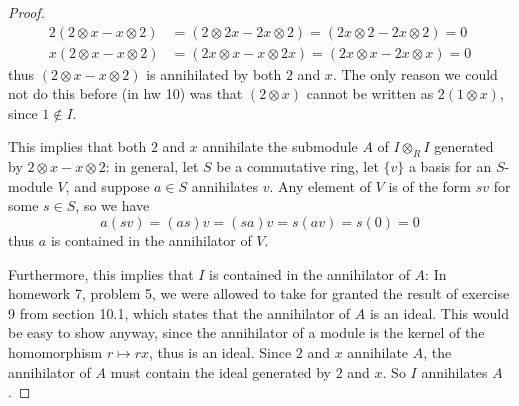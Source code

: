 \documentclass[10pt]{article}
\begin{document}
\begin{enumerate}
\begin{proof}
\begin{align*}
2(2 \otimes x - x \otimes 2) &= (2 \otimes 2x - 2x \otimes 2) = (2x \otimes 2 - 2x \otimes 2) = 0
\\
x(2 \otimes x - x \otimes 2) &= (2x \otimes x - x \otimes 2x) = (2x \otimes x - 2x \otimes x) = 0
\end{align*}
thus $(2 \otimes x - x \otimes 2)$ is annihilated by both $2$ and $x$.  The only reason we could not do this before (in hw 10) was that $(2 \otimes x)$ cannot be written as $2(1 \otimes x)$, since $1 \not \in I$.

This implies that both $2$ and $x$ annihilate the submodule $A$ of $I \otimes_R I$ generated by $2 \otimes x - x \otimes 2$: in general, let $S$ be a commutative ring, let $\{v\}$ a basis for an $S$-module $V$, and suppose $a \in S$ annihilates $v$.  Any element of $V$ is of the form $sv$ for some $s \in S$, so we have
$$
a(sv) = (as)v = (sa)v = s(av) = s(0) = 0
$$
thus $a$ is contained in the annihilator of $V$.

Furthermore, this implies that $I$ is contained in the annihilator of $A$:  In homework 7, problem 5, we were allowed to take for granted the result of exercise 9 from section 10.1, which states that the annihilator of $A$ is an ideal.  This would be easy to show anyway, since the annihilator of a module is the kernel of the homomorphism $r \mapsto rx$, thus is an ideal.  Since $2$ and $x$ annihilate $A$, the annihilator of $A$ must contain the ideal generated by $2$ and $x$.  So $I$ annihilates $A$.


\end{proof}
\end{enumerate}
\end{document}
